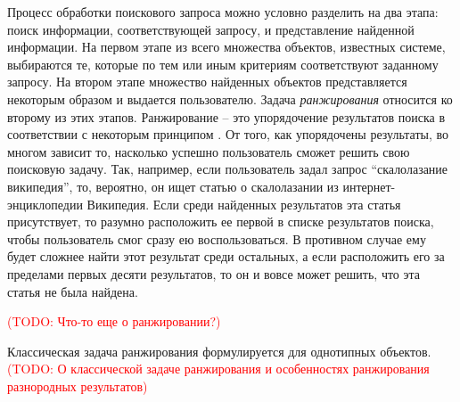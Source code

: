 \documentclass[12pt,a4paper]{report}
\newcommand\note[1]{\textcolor{red}{(#1)}}
\newcommand\todonote[1]{\note{TODO: #1}}
\begin{document}
Процесс обработки поискового запроса можно условно разделить на два этапа: поиск информации, соответствующей запросу, и представление найденной информации.
На первом этапе из всего множества объектов, известных системе, выбираются те, которые по тем или иным критериям соответствуют заданному запросу. На втором этапе множество найденных объектов представляется некоторым образом и выдается пользователю. 
Задача \emph{ранжирования} относится ко второму из этих этапов. Ранжирование -- это упорядочение результатов поиска в соответствии с некоторым принципом \cite{Ashmanov, LiuLR}. От того, как упорядочены результаты, во многом зависит то, насколько успешно пользователь сможет решить свою поисковую задачу. 
Так, например, если пользователь задал запрос ``скалолазание википедия'', то, вероятно, он ищет статью о скалолазании из интернет-энциклопедии Википедия. Если среди найденных результатов эта статья присутствует, то разумно расположить ее первой в списке результатов поиска, чтобы пользователь смог сразу ею воспользоваться. В противном случае ему будет сложнее найти этот результат среди остальных, а если расположить его за пределами первых десяти результатов, то он и вовсе может решить, что эта статья не была найдена.



\todonote{Что-то еще о ранжировании?}

Классическая задача ранжирования формулируется для однотипных объектов.
\todonote{О классической задаче ранжирования и особенностях ранжирования разнородных результатов}

\end{document}
